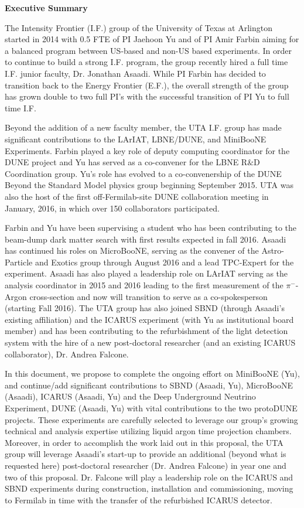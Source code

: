 \begin{center}
\textbf{ \Large{Executive Summary} }
\end{center}

The Intensity Frontier (I.F.) group of the University of Texas at Arlington started in 2014 with 0.5 FTE of PI Jaehoon Yu and of PI Amir Farbin aiming for a balanced program between US-based and non-US based experiments. In order to continue to build a strong I.F. program, the group recently hired a full time I.F. junior faculty, Dr. Jonathan Asaadi. While PI Farbin has decided to transition back to the Energy Frontier (E.F.), the overall strength of the group has grown double to two full PI's with the successful transition of PI Yu to full time I.F.

Beyond the addition of a new faculty member, the UTA I.F. group has made significant contributions to the LArIAT, LBNE/DUNE, and MiniBooNE Experiments. Farbin played a key role of deputy computing coordinator for the DUNE project and Yu has served as a co-convener for the LBNE R$\&$D Coordination group. Yu's role has evolved to a co-convenership of the DUNE Beyond the Standard Model physics group beginning September 2015. UTA was also the host of the first off-Fermilab-site DUNE collaboration meeting in January, 2016, in which over 150 collaborators participated. 

Farbin and Yu have been supervising a student who has been contributing to the beam-dump dark matter search with first results expected in fall 2016. Asaadi has continued his roles on MicroBooNE, serving as the convener of the Astro-Particle and Exotics group through August 2016 and a lead TPC-Expert for the experiment. Asaadi has also played a leadership role on LArIAT serving as the analysis coordinator in 2015 and 2016 leading to the first measurement of the $\pi^{-}$-Argon cross-section and now will transition to serve as a co-spokesperson (starting Fall 2016). The UTA group has also joined SBND (through Asaadi's existing affiliation) and the ICARUS experiment (with Yu as institutional board member) and has been contributing to the refurbishment of the light detection system with the hire of a new post-doctoral researcher (and an existing ICARUS collaborator), Dr. Andrea Falcone.

In this document, we propose to complete the ongoing effort on MiniBooNE (Yu), and continue/add significant contributions to SBND (Asaadi, Yu), MicroBooNE (Asaadi), ICARUS (Asaadi, Yu) and the Deep Underground Neutrino Experiment, DUNE (Asaadi, Yu) with vital contributions to the two protoDUNE projects. These experiments are carefully selected to leverage our group's growing technical and analysis expertise utilizing liquid argon time projection chambers. Moreover, in order to accomplish the work laid out in this proposal, the UTA group will leverage Asaadi's start-up to provide an additional (beyond what is requested here) post-doctoral researcher (Dr. Andrea Falcone) in year one and two of this proposal. Dr. Falcone will play a leadership role on the ICARUS and SBND experiments during construction, installation and commissioning, moving to Fermilab in time with the transfer of the refurbished ICARUS detector.

